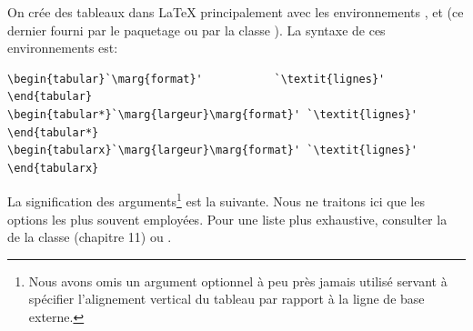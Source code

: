 On crée des tableaux dans {\LaTeX} principalement avec les
environnements ,  et  (ce
dernier fourni par le paquetage  ou par la classe
). La syntaxe de ces environnements est:
\begin{lstlisting}
\begin{tabular}`\marg{format}'           `\textit{lignes}' \end{tabular}
\begin{tabular*}`\marg{largeur}\marg{format}' `\textit{lignes}' \end{tabular*}
\begin{tabularx}`\marg{largeur}\marg{format}' `\textit{lignes}' \end{tabularx}
\end{lstlisting}
La signification des arguments\footnote{%
  Nous avons omis un argument optionnel à peu près jamais utilisé
  servant à spécifier l'alignement vertical du tableau par rapport à
  la ligne de base externe.} %
est la suivante. Nous ne traitons ici que les options les plus souvent
employées. Pour une liste plus exhaustive, consulter la %
de la classe  (chapitre 11) ou %
\citet[section ]{wikilivres:latex}.

